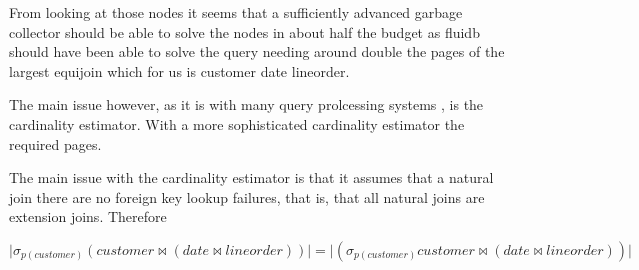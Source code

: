 From looking at those nodes it seems that a sufficiently advanced
garbage collector should be able to solve the nodes in about half the
budget as fluidb should have been able to solve the query needing
around double the pages of the largest equijoin which for us is
customer date lineorder.

The main issue however, as it is with many query prolcessing systems
\cite{leisHowGoodAre2015}, is the cardinality estimator. With a more
sophisticated cardinality estimator the required pages.

The main issue with the cardinality estimator is that it assumes that
a natural join there are no foreign key lookup failures, that is, that
all natural joins are extension joins. Therefore

\[
\lvert \sigma _{p(customer)} (customer \Join (date \Join lineorder)) \rvert = \lvert (\sigma _{p(customer)} customer \Join (date \Join lineorder)) \rvert
\]
